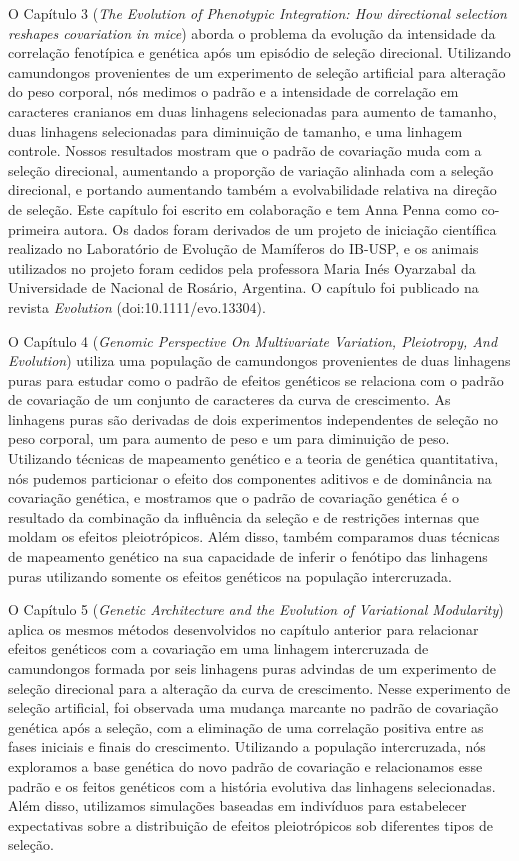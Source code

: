 \begin{refsection}
O Capítulo 3 (\textit{The Evolution of Phenotypic Integration: How directional
selection reshapes covariation in mice}) aborda o problema da evolução da
intensidade da correlação fenotípica e genética após um episódio de seleção
direcional. Utilizando camundongos provenientes de um experimento de seleção
artificial para alteração do peso corporal, nós medimos o padrão e a
intensidade de correlação em caracteres cranianos em duas linhagens
selecionadas para aumento de tamanho, duas linhagens selecionadas para
diminuição de tamanho, e uma linhagem controle. Nossos resultados mostram que
o padrão de covariação muda com a seleção direcional, aumentando a proporção
de variação alinhada com a seleção direcional, e portando aumentando também a
evolvabilidade relativa na direção de seleção. Este capítulo foi escrito em
colaboração e tem Anna Penna como co-primeira autora. Os dados foram derivados
de um projeto de iniciação científica realizado no Laboratório de Evolução de
Mamíferos do IB-USP, e os animais utilizados no projeto foram cedidos pela professora
Maria Inés Oyarzabal da Universidade de Nacional de Rosário, Argentina. O
capítulo foi publicado na revista \textit{Evolution} (doi:10.1111/evo.13304).

O Capítulo 4 (\textit{Genomic Perspective On Multivariate Variation,
Pleiotropy, And Evolution}) utiliza uma população de camundongos
provenientes de duas linhagens puras para estudar como o padrão de efeitos
genéticos se relaciona com o padrão de covariação de um conjunto de caracteres
da curva de crescimento. As linhagens puras são derivadas de dois experimentos
independentes de seleção no peso corporal, um para aumento de peso e um para
diminuição de peso. Utilizando técnicas de mapeamento genético e a teoria de
genética quantitativa, nós pudemos particionar o efeito dos
componentes aditivos e de dominância na covariação genética, e mostramos que o
padrão de covariação genética é o resultado da combinação da influência da
seleção e de restrições internas que moldam os efeitos pleiotrópicos. Além
disso, também comparamos duas técnicas de mapeamento genético na sua
capacidade de inferir o fenótipo das linhagens puras utilizando somente os
efeitos genéticos na população intercruzada. 

O Capítulo 5 (\textit{Genetic Architecture and the Evolution of Variational
Modularity}) aplica os mesmos métodos desenvolvidos no capítulo anterior para
relacionar efeitos genéticos com a covariação em uma linhagem intercruzada de
camundongos formada por seis linhagens puras advindas de um experimento de
seleção direcional para a alteração da curva de crescimento. Nesse experimento
de seleção artificial, foi observada uma mudança marcante no padrão de
covariação genética após a seleção, com a eliminação de uma correlação
positiva entre as fases iniciais e finais do crescimento. Utilizando a
população intercruzada, nós exploramos a base genética do novo padrão de
covariação e relacionamos esse padrão e os feitos genéticos com a história
evolutiva das linhagens selecionadas. Além disso, utilizamos simulações
baseadas em indivíduos para estabelecer expectativas sobre a distribuição de
efeitos pleiotrópicos sob diferentes tipos de seleção.


\end{refsection}
